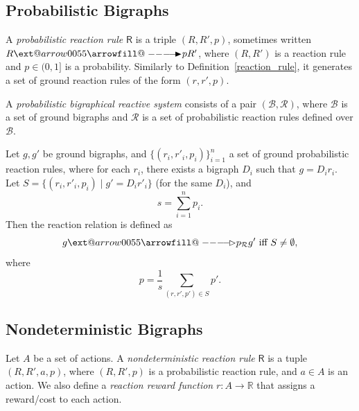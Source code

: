 \documentclass[runningheads]{llncs}
\makeatletter
\providecommand\longrightarrowRHD{\relbar\joinrel\relbar\joinrel\mathrel\RHD}
\providecommand\longrightarrowrhd{\relbar\joinrel\relbar\joinrel\mathrel\rhd}
\providecommand*\xrightarrowRHD[2][]{\ext@arrow 0055{\arrowfill@\relbar\relbar\longrightarrowRHD}{#1}{#2}}
\providecommand*\xrightarrowrhd[2][]{\ext@arrow 0055{\arrowfill@\relbar\relbar\longrightarrowrhd}{#1}{#2}}
\makeatother
\begin{document}
\subsection{Probabilistic Bigraphs}

\begin{definition}
  A \emph{probabilistic reaction rule} $\mathsf{R}$ is a triple $(R, R', p)$,
  sometimes written $R \xrightarrowRHD{p} R'$, where $(R, R')$ is a reaction
  rule and $p \in (0, 1]$ is a probability. Similarly to
  Definition~\ref{reaction_rule}, it generates a set of ground reaction rules of
  the form $(r, r', p)$.
\end{definition}

\begin{definition}
  A \emph{probabilistic bigraphical reactive system} consists of a pair
  $(\mathcal{B}, \mathcal{R})$, where $\mathcal{B}$ is a set of ground bigraphs
  and $\mathcal{R}$ is a set of probabilistic reaction rules defined over
  $\mathcal{B}$.

  Let $g, g'$ be ground bigraphs, and $\{ (r_i, r'_i, p_i) \}_{i=1}^n$ a set of
  ground probabilistic reaction rules, where for each $r_i$, there exists a
  bigraph $D_i$ such that $g = D_ir_i$. Let $S = \{ (r_i, r'_i, p_i) \mid g' =
  D_ir'_i \}$ (for the same $D_i$), and
  \[ s = \sum_{i=1}^n p_i. \]
  Then the reaction relation is defined as
  \[ g \xrightarrowrhd{p}_{\mathcal{R}} g' \text{ iff } S \ne \emptyset, \]
  where
  \[ p = \frac{1}{s}\sum_{(r, r', p') \in S} p'. \]
\end{definition}

\subsection{Nondeterministic Bigraphs}

\begin{definition}
  Let $A$ be a set of actions. A \emph{nondeterministic reaction rule}
  $\mathsf{R}$ is a tuple $(R, R', a, p)$, where $(R, R', p)$ is a probabilistic
  reaction rule, and $a \in A$ is an action. We also define a \emph{reaction
    reward function} $r : A \to \mathbb{R}$ that assigns a reward/cost to each
  action.
\end{definition}
\end{document}
